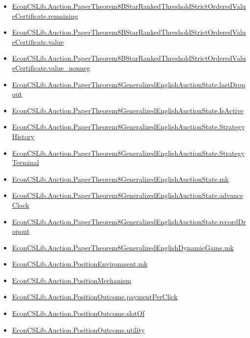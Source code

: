 \documentclass[10pt]{article}
\begin{document}
\begin{itemize}[leftmargin=1.2em]
\begin{itemize}[leftmargin=1.2em]
\item \hyperlink{library-prerequisite-21f6b15d625d5c12}{EconCSLib.Auction.PaperTheorem8BStarRankedThresholdStrictOrderedValueCertificate.remaining}
\item \hyperlink{library-prerequisite-1a9eb0b6e2fbc83e}{EconCSLib.Auction.PaperTheorem8BStarRankedThresholdStrictOrderedValueCertificate.value}
\item \hyperlink{library-prerequisite-0a9393bf81e26f0a}{EconCSLib.Auction.PaperTheorem8BStarRankedThresholdStrictOrderedValueCertificate.value\_nonneg}
\item \hyperlink{library-prerequisite-c2dcf6eab1d02a07}{EconCSLib.Auction.PaperTheorem8GeneralizedEnglishAuctionState.lastDropout}
\item \hyperlink{library-prerequisite-bc5b66442d488641}{EconCSLib.Auction.PaperTheorem8GeneralizedEnglishAuctionState.IsActive}
\item \hyperlink{library-prerequisite-198c4724183f8a9b}{EconCSLib.Auction.PaperTheorem8GeneralizedEnglishAuctionState.StrategyHistory}
\item \hyperlink{library-prerequisite-6babd801175a9712}{EconCSLib.Auction.PaperTheorem8GeneralizedEnglishAuctionState.StrategyTerminal}
\item \hyperlink{library-prerequisite-54d726ea9aa5ac05}{EconCSLib.Auction.PaperTheorem8GeneralizedEnglishAuctionState.mk}
\item \hyperlink{library-prerequisite-5dbfd11518f7387b}{EconCSLib.Auction.PaperTheorem8GeneralizedEnglishAuctionState.advanceClock}
\item \hyperlink{library-prerequisite-6fcae156ccedfeeb}{EconCSLib.Auction.PaperTheorem8GeneralizedEnglishAuctionState.recordDropout}
\item \hyperlink{library-prerequisite-ecafecb71e63e8ff}{EconCSLib.Auction.PaperTheorem8GeneralizedEnglishDynamicGame.mk}
\item \hyperlink{library-prerequisite-902f9089c054dced}{EconCSLib.Auction.PositionEnvironment.mk}
\item \hyperlink{library-prerequisite-955182b4d6b6bc1d}{EconCSLib.Auction.PositionMechanism}
\item \hyperlink{library-prerequisite-520dbb13bd671f46}{EconCSLib.Auction.PositionOutcome.paymentPerClick}
\item \hyperlink{library-prerequisite-b37dbc8bbb5249d8}{EconCSLib.Auction.PositionOutcome.slotOf}
\item \hyperlink{library-prerequisite-621c99d677928859}{EconCSLib.Auction.PositionOutcome.utility}

\end{itemize}
\end{itemize}
\end{document}
